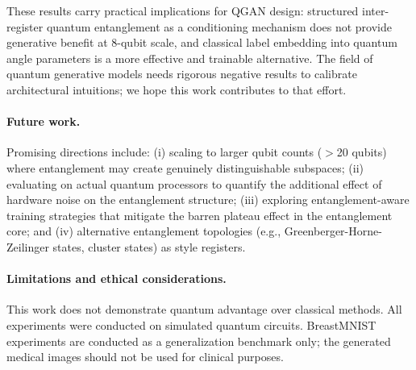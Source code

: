 \documentclass[twocolumn]{article}
\begin{document}
These results carry practical implications for QGAN design: structured
inter-register quantum entanglement as a conditioning mechanism does not
provide generative benefit at 8-qubit scale, and classical label embedding
into quantum angle parameters is a more effective and trainable alternative.
The field of quantum generative models needs rigorous negative results to
calibrate architectural intuitions; we hope this work contributes to that effort.

\paragraph{Future work.} Promising directions include: (i) scaling to larger
qubit counts ($>$20 qubits) where entanglement may create genuinely distinguishable
subspaces; (ii) evaluating on actual quantum processors to quantify the additional
effect of hardware noise on the entanglement structure; (iii) exploring
entanglement-aware training strategies that mitigate the barren plateau effect
in the entanglement core; and (iv) alternative entanglement topologies
(e.g., Greenberger-Horne-Zeilinger states, cluster states) as style registers.

\paragraph{Limitations and ethical considerations.}
This work does not demonstrate quantum advantage over classical methods.
All experiments were conducted on simulated quantum circuits. BreastMNIST
experiments are conducted as a generalization benchmark only; the generated
medical images should not be used for clinical purposes.



\end{document}
